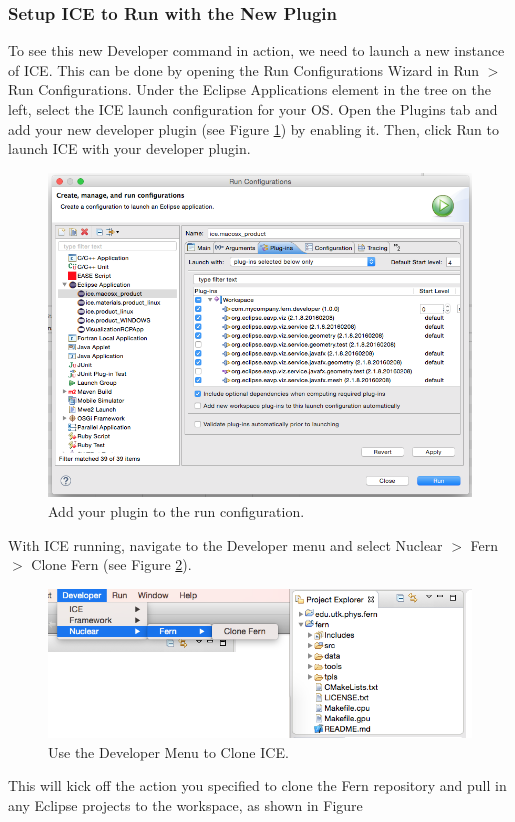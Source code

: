 \subsubsection*{Setup ICE to Run with the New Plugin}
To see this new Developer command in action, we need to launch a new instance of
ICE. This can be done by opening the Run Configurations Wizard in Run $>$ Run
Configurations. Under the Eclipse Applications element in the tree on the left,
select the ICE launch configuration for your OS. Open the Plugins tab and add
your new developer plugin (see Figure \ref{fig:launch}) by enabling it. Then,
click Run to launch ICE with your developer plugin. 
\begin{figure}[h]
\includegraphics[width=\textwidth]{figures/launch.png}
\caption{Add your plugin to the run configuration.}
\label{fig:launch}
\end{figure}
With ICE running, navigate to the Developer menu and select Nuclear $>$ Fern $>$
Clone Fern (see Figure \ref{fig:clonefern}).
\begin{figure}[h]
\includegraphics[width=\textwidth]{figures/cloned.png}
\caption{Use the Developer Menu to Clone ICE.}
\label{fig:clonefern}
\end{figure}

This will kick off the action you specified to clone the Fern repository and
pull in any Eclipse projects to the workspace, as shown in Figure
